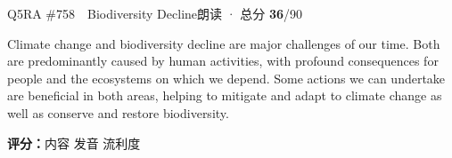 \begin{qblock}{Q5\quad RA \#758\ \ Biodiversity Decline}{朗读 · 总分 \textcolor{cAccent}{\bfseries 36}/90}
\begin{promptbox}
Climate change and biodiversity decline are major challenges of our time. Both are predominantly caused by human activities, with profound consequences for people and the ecosystems on which we depend. Some actions we can undertake are beneficial in both areas, helping to mitigate and adapt to climate change as well as conserve and restore biodiversity.
\end{promptbox}
\asrlegend
\begin{asrbox}
        \pse {}        \pse {}  \pse {}    \pse {}     \pse {}             \pse {}              
\end{asrbox}
\smallskip
{\small\textbf{评分：}内容  \quad\textperiodcentered\quad 发音  \quad\textperiodcentered\quad 流利度 }
\end{qblock}

